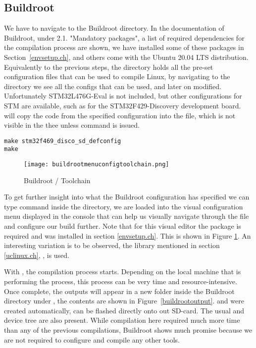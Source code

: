 \subsection{Buildroot} \label{compbuildroot.ch}
We have to navigate to the Buildroot directory. In the documentation of Buildroot, under 2.1. "Mandatory packages", a list of required dependencies for the compilation process are shown, we have installed some of these packages in Section~\ref{envsetup.ch}, and others come with the Ubuntu 20.04 LTS distribution. Equivalently to the previous steps, the  directory holds all the pre-set configuration files that can be used to compile Linux, by navigating to the directory we see all the configs that can be used, and later on modified. Unfortunately STM32L476G-Eval is not included, but other configurations for STM are available, such as  for the STM32F429-Discovery development board.  will copy the code from the specified configuration into the  file, which is not visible in the thee unless command  is issued.

\begin{lstlisting}[style=SH, caption=buildroot, label=buildroot]
make stm32f469_disco_sd_defconfig
make
\end{lstlisting}

\begin{figure}[H]
\centering
\texttt{[image: buildrootmenuconfigtoolchain.png]}
\caption{Buildroot  / Toolchain}
\label{buildrootmenuconfigtoolchain}
\end{figure}

To get further insight into what the Buildroot configuration has specified we can type command  inside the directory, we are loaded into the visual configuration menu displayed in the console that can help us visually navigate through the  file and configure our build further. Note that for this visual editor the  package is required and was installed in section \ref{envsetup.ch}. This is shown in Figure \ref{buildrootmenuconfigtoolchain}. An interesting variation is to be observed, the library mentioned in section \ref{uclinux.ch}, , is used.

With , the compilation process starts. Depending on the local machine that is performing the process, this process can be very time and resource-intensive. Once complete, the outputs will appear in a new folder inside the Buildroot directory under , the contents are shown in Figure~\ref{buildrootoutput}.  and  were created automatically,  can be flashed directly onto out SD-card. The usual  and device tree  are also present. While compilation here required much more time than any of the previous compilations, Buildroot shows much promise because we are not required to configure and compile any other tools.

